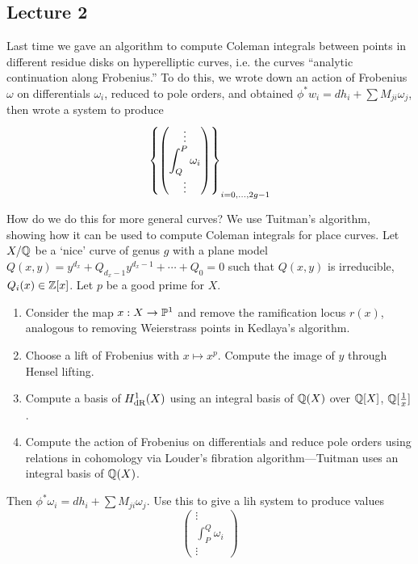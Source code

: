 \newpage
\subsection{Lecture 2}

Last time we gave an algorithm to compute Coleman integrals between points in different residue disks on hyperelliptic curves, i.e. the  curves ``analytic continuation along Frobenius.'' To do this, we wrote down an action of Frobenius $\omega$ on differentials $\omega_i$, reduced to pole orders, and obtained $\phi^* w_i= dh_i + \sum M_{ji} \omega_j$, then wrote a system to produce 
	\[
	\left\{
	\begin{pmatrix}
	\vdots \\
	\ds \int_Q^P \omega_i \\
	\vdots
	\end{pmatrix} \right\}_{i=0,\ldots,2g-1}
	\]


How do we do this for more general curves? We use Tuitman's algorithm, showing how it can be used to compute Coleman integrals for place curves. Let $X/\Q$ be a `nice' curve of genus $g$ with a plane model $Q(x,y)= y^{d_x} + Q_{d_x-1} y^{d_x-1} + \cdots + Q_0= 0$ such that $Q(x,y)$ is irreducible, $Q_i(x) \in \Z[x]$. Let $p$ be a good prime for $X$.


\begin{enumerate}[1.]
\item Consider the map $x: X \to \P^1$ and remove the ramification locus $r(x)$, analogous to removing Weierstrass points in Kedlaya's algorithm. 
\item Choose a lift of Frobenius with $x \mapsto x^p$. Compute the image of $y$ through Hensel lifting. 
\item Compute a basis of $H_{\dr}^1(X)$ using an integral basis of $\Q(X)$ over $\Q[X]$, $\Q[\frac{1}{x}]$.
\item Compute the action of Frobenius on differentials and reduce pole orders using relations in cohomology via Louder's fibration algorithm---Tuitman uses an integral basis of $\Q(X)$. 
\end{enumerate}


Then $\phi^*\omega_i= dh_i + \sum M_{ji} \omega_j$. Use this to give a lih system to produce values
	\[
	\begin{pmatrix}
	\vdots \\
	\int_P^Q \omega_i \\
	\vdots
	\end{pmatrix}
	\]


